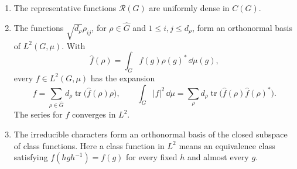 \begin{theorem}\label{thm:peterweyl}
\begin{enumerate}[label=(\alph*)]
\item The representative functions $\mathcal R(G)$ are uniformly dense in $C(G)$.
\item The functions $\sqrt{d_\rho}\rho_{ij}$, for $\rho\in\widehat G$ and $1\le i,j\le d_\rho$, form an orthonormal basis of $L^2(G,\mu)$. With
\[
\widehat f(\rho)=\int_G f(g)\rho(g)^*\,\dd\mu(g),
\]
every $f\in L^2(G,\mu)$ has the expansion
\[
f=\sum_{\rho\in\widehat G}d_\rho\operatorname{tr}\bigl(\widehat f(\rho)\rho\bigr),
\qquad
\int_G|f|^2\,\dd\mu
=\sum_\rho d_\rho\operatorname{tr}\bigl(\widehat f(\rho)\widehat f(\rho)^*\bigr).
\]
The series for $f$ converges in $L^2$.
\item The irreducible characters form an orthonormal basis of the closed subspace of class functions. Here a class function in $L^2$ means an equivalence class satisfying $f(hgh^{-1})=f(g)$ for every fixed $h$ and almost every $g$.
\end{enumerate}
\end{theorem}

